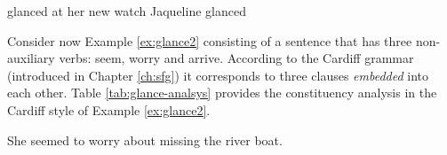     \begin{exe}
        \ex\label{ex:glance11} glanced at her new watch
        \ex\label{ex:glance12} Jaqueline glanced
    \end{exe}

    Consider now Example \ref{ex:glance2} consisting of a sentence that has three non-auxiliary verbs: seem, worry and arrive. According to the Cardiff grammar (introduced in Chapter \ref{ch:sfg}) it corresponds to three clauses \textit{embedded} into each other. Table \ref{tab:glance-analsys} provides the constituency analysis in the Cardiff style of Example \ref{ex:glance2}.

    \begin{exe}
        \ex\label{ex:glance2} She seemed to worry about missing the river boat.
    \end{exe}
    
    \begin{table}[!ht]
        \centering
        \caption{SF constituency analysis in Cardiff grammar style of Example \ref{ex:glance2}}
        \label{tab:glance-analsys}
    \end{table}

